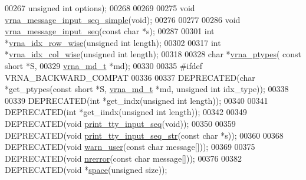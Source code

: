 \begin{DoxyCode}
00267                             \textcolor{keywordtype}{unsigned} \textcolor{keywordtype}{int} options);
00268 
00269 
00275 \textcolor{keywordtype}{void} \hyperlink{group__utils_gaee1dd652ca5b9e56b096963a1576f73b}{vrna\_message\_input\_seq\_simple}(\textcolor{keywordtype}{void});
00276 
00277 
00286 \textcolor{keywordtype}{void} \hyperlink{group__utils_gaf4d194d558b0c975f269de01dea52460}{vrna\_message\_input\_seq}(\textcolor{keyword}{const} \textcolor{keywordtype}{char} *s);
00287 
00301 \textcolor{keywordtype}{int} *\hyperlink{group__utils_ga70b180e9ea764218a82647a1cd347445}{vrna\_idx\_row\_wise}(\textcolor{keywordtype}{unsigned} \textcolor{keywordtype}{int} length);
00302 
00317 \textcolor{keywordtype}{int} *\hyperlink{group__utils_ga89ebc69c52fa0c78c9e1974b0017746b}{vrna\_idx\_col\_wise}(\textcolor{keywordtype}{unsigned} \textcolor{keywordtype}{int} length);
00318 
00328 \textcolor{keywordtype}{char}  *\hyperlink{group__utils_ga51a9e86a5f731f5f2f5584ee67cee4a8}{vrna\_ptypes}( \textcolor{keyword}{const} \textcolor{keywordtype}{short} *S,
00329                     \hyperlink{group__model__details_structvrna__md__s}{vrna\_md\_t} *md);
00330 
00335 \textcolor{preprocessor}{#ifdef  VRNA\_BACKWARD\_COMPAT}
00336 
00337 DEPRECATED(\textcolor{keywordtype}{char}  *get\_ptypes(\textcolor{keyword}{const} \textcolor{keywordtype}{short} *S, \hyperlink{group__model__details_structvrna__md__s}{vrna\_md\_t} *md, \textcolor{keywordtype}{unsigned} \textcolor{keywordtype}{int} idx\_type));
00338 
00339 DEPRECATED(\textcolor{keywordtype}{int}   *get\_indx(\textcolor{keywordtype}{unsigned} \textcolor{keywordtype}{int} length));
00340 
00341 DEPRECATED(\textcolor{keywordtype}{int}   *get\_iindx(\textcolor{keywordtype}{unsigned} \textcolor{keywordtype}{int} length));
00342 
00349 DEPRECATED(\textcolor{keywordtype}{void} \hyperlink{utils_8h_a6bf778117d31b7fd90db435323f4ef74}{print\_tty\_input\_seq}(\textcolor{keywordtype}{void}));
00350 
00359 DEPRECATED(\textcolor{keywordtype}{void} \hyperlink{utils_8h_ae4ef89b662a3e9b5b5f0781d9757aba0}{print\_tty\_input\_seq\_str}(\textcolor{keyword}{const} \textcolor{keywordtype}{char} *s));
00360 
00368 DEPRECATED(\textcolor{keywordtype}{void} \hyperlink{utils_8h_af2355fa8746f2f30fbe71db65dea3d51}{warn\_user}(\textcolor{keyword}{const} \textcolor{keywordtype}{char} message[]));
00369 
00375 DEPRECATED(\textcolor{keywordtype}{void} \hyperlink{utils_8h_a127ce946e56b5a5773781cabe68e38c5}{nrerror}(\textcolor{keyword}{const} \textcolor{keywordtype}{char} message[]));
00376 
00382 DEPRECATED(\textcolor{keywordtype}{void} *\hyperlink{utils_8h_ad7e1e137b3bf1f7108933d302a7f0177}{space}(\textcolor{keywordtype}{unsigned} size));

\end{DoxyCode}
